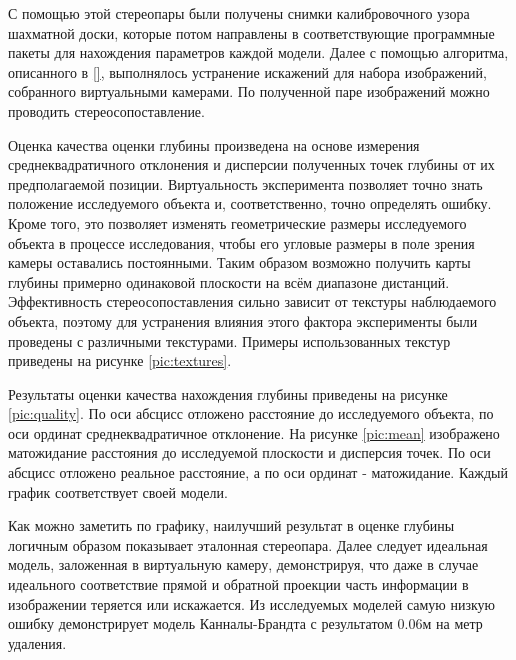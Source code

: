 

С помощью этой стереопары были получены снимки калибровочного узора шахматной доски, 
которые потом  направлены в соответствующие программные пакеты для нахождения параметров каждой модели. Далее с помощью алгоритма, описанного в \ref{},				%
выполнялось устранение искажений для набора изображений, собранного виртуальными камерами. По полученной паре изображений 
можно проводить стереосопоставление.

Оценка качества оценки глубины произведена на основе измерения среднеквадратичного отклонения и дисперсии полученных точек 
глубины от их предполагаемой позиции. Виртуальность эксперимента позволяет точно знать положение исследуемого объекта и, соответственно, 
точно определять ошибку. Кроме того, это позволяет изменять геометрические размеры исследуемого объекта в процессе исследования, чтобы его
угловые размеры в поле зрения камеры оставались постоянными. Таким образом возможно получить карты глубины примерно одинаковой 
плоскости на всём диапазоне дистанций.  Эффективность стереосопоставления \cite{SGBM} сильно зависит от текстуры наблюдаемого объекта, 
поэтому для устранения влияния этого фактора эксперименты были проведены с различными текстурами. 
Примеры использованных текстур приведены на рисунке \ref{pic:textures}. 


Результаты оценки качества нахождения глубины приведены на рисунке \ref{pic:quality}. По оси абсцисс отложено расстояние до исследуемого объекта,
по оси ординат среднеквадратичное отклонение. На рисунке \ref{pic:mean} изображено матожидание расстояния до исследуемой плоскости 
и дисперсия точек. По оси абсцисс отложено реальное расстояние, а по оси ординат - матожидание. Каждый график соответствует своей модели.

Как можно заметить по графику, наилучший результат в оценке глубины логичным образом показывает эталонная стереопара. Далее следует 
идеальная модель, заложенная в виртуальную камеру, демонстрируя, что даже в случае идеального соответствие прямой и обратной проекции часть 
информации в изображении теряется или искажается. Из исследуемых моделей самую низкую ошибку демонстрирует модель Канналы-Брандта с результатом
0.06м на метр удаления. 

